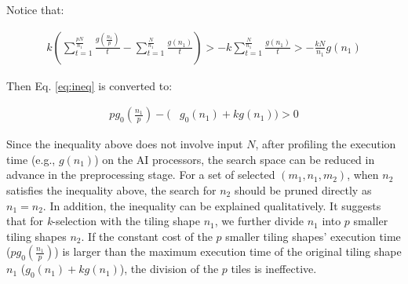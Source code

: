 \documentclass[12pt]{extbook}
\begin{document}
Notice that:


\begin{equation}
    \begin{aligned}
        k (\sum_{t=1}^{\frac{pN}{n_{1}}}\frac{g(\frac{n_{1}}{p})}{t} - \sum_{t=1}^{\frac{N}{n_{1}}}\frac{g(n_{1})}{t}) > - k \sum_{t=1}^{\frac{N}{n_{1}}}\frac{g(n_{1})}{t} > - \frac{kN}{n_{1}} g(n_{1})
    \end{aligned}
\end{equation}

Then Eq. \ref{eq:ineq} is converted to:


\begin{equation}
    \label{eq:last}
    \begin{aligned}
        pg_{0}(\frac{n_{1}}{p}) - (&g_{0}(n_{1}) + kg(n_{1})) > 0
    \end{aligned}
\end{equation}

Since the inequality above does not involve input $N$, after profiling the execution time (e.g., $g(n_{1})$) on the AI processors, the search space can be reduced in advance in the preprocessing stage. For a set of selected $(m_{1}, n_{1}, m_{2})$, when $n_{2}$ satisfies the inequality above, the search for $n_{2}$ should be pruned directly as $n_{1} = n_{2}$. In addition, the inequality can be explained qualitatively. It suggests that for \textit{k}-selection with the tiling shape $n_{1}$, we further divide $n_{1}$ into $p$ smaller tiling shapes $n_{2}$. If the constant cost of the $p$ smaller tiling shapes' execution time ($pg_{0}(\frac{n_{1}}{p})$) is larger than the maximum execution time of the original tiling shape $n_{1}$ ($g_{0}(n_{1}) + kg(n_{1})$), the division of the $p$ tiles is ineffective.

\begin{figure}[htbp]
\end{figure}
\end{document}
